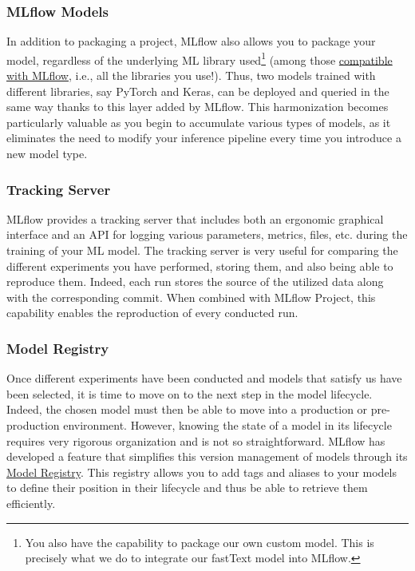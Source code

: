 

\subsubsection{MLflow Models}

In addition to packaging a project, MLflow also allows you to package your model, regardless of the underlying ML library used\footnote{You also have the capability to package our own custom model. This is precisely what we do to integrate our fastText model into MLflow.}  (among those \href{https://MLflow.org/docs/latest/models.html#built-in-model-flavors}{compatible with MLflow}, i.e., all the libraries you use!). Thus, two models trained with different libraries, say PyTorch and Keras, can be deployed and queried in the same way thanks to this layer added by MLflow. This harmonization becomes particularly valuable as you begin to accumulate various types of models, as it eliminates the need to modify your inference pipeline every time you introduce a new model type.

\subsubsection{Tracking Server}

MLflow provides a tracking server that includes both an ergonomic graphical interface and an API for logging various parameters, metrics, files, etc. during the training of your ML model. The tracking server is very useful for comparing the different experiments you have performed, storing them, and also being able to reproduce them. Indeed, each run stores the source of the utilized data along with the corresponding commit. When combined with MLflow Project, this capability enables the reproduction of every conducted run.

\subsubsection{Model Registry}

Once different experiments have been conducted and models that satisfy us have been selected, it is time to move on to the next step in the model lifecycle. Indeed, the chosen model must then be able to move into a production or pre-production environment. However, knowing the state of a model in its lifecycle requires very rigorous organization and is not so straightforward. MLflow has developed a feature that simplifies this version management of models through its \href{https://MLflow.org/docs/latest/model-registry.html}{Model Registry}. This registry allows you to add tags and aliases to your models to define their position in their lifecycle and thus be able to retrieve them efficiently.

